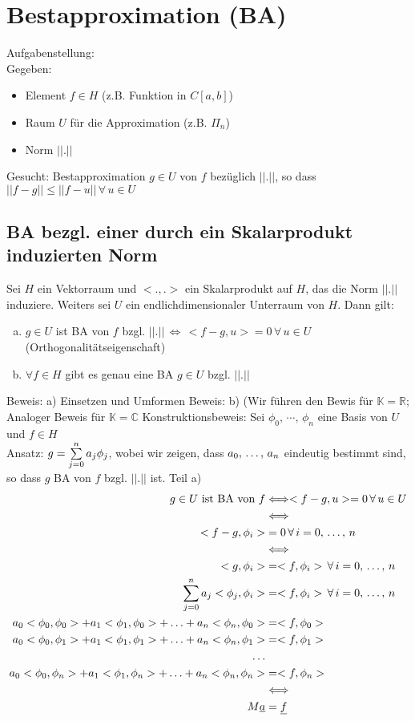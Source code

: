 \section{Bestapproximation (BA)}
Aufgabenstellung:\\
Gegeben:
\begin{itemize}
  \item Element $f \in H$ (z.B. Funktion in $C[a,b]$)
  \item Raum $U$ für die Approximation (z.B. $\Pi_n$)
  \item Norm $||.||$
\end{itemize}
Gesucht:
Bestapproximation $g \in U$ von $f$ bezüglich $||.||$, so dass 
$||f - g|| \leq ||f - u||\,\forall\,u \in U$

\subsection{BA bezgl. einer durch ein Skalarprodukt induzierten Norm}
 Sei $H$ ein Vektorraum und $<.,.>$ ein Skalarprodukt auf $H$, das die
Norm $||.||$ induziere. Weiters sei $U$ ein endlichdimensionaler Unterraum von $H$.
Dann gilt:
\begin{enumerate}[(a)]
  \item $g \in U$ ist BA von $f$ bzgl. 
    $||.||\,\Longleftrightarrow\,<f - g, u> = 0\,\forall\,u \in U$
    (Orthogonalitätseigenschaft)
  \item $\forall f \in H$ gibt es genau eine BA $g \in U$ bzgl. $||.||$
\end{enumerate}
Beweis: a) Einsetzen und Umformen
Beweis: b) (Wir führen den Bewis für $\mathbb{K} = \mathbb{R}$;
Analoger Beweis für $\mathbb{K} = \mathbb{C}$
Konstruktionsbeweis: Sei ${\phi_0,\,\cdots,\,\phi_n}$ eine Basis von $U$ und $f \in H$\\
Ansatz: $g = \sum\limits_{j=0}^{n}{a_j \phi_j}$, wobei wir zeigen, dass $a_0,\,\ldots,\,a_n$
eindeutig bestimmt sind, so dass $g$ BA von $f$ bzgl. $||.||$ ist.
Teil a)
\begin{align*}
  g \in U \text{ ist BA von } f &\Longleftrightarrow <f - g, u> = 0\, \forall\, u \in U\\
  &\Longleftrightarrow\\
  <f-g, \phi_i> &= 0\, \forall\, i=0,\,\ldots,\,n\\
  &\Longleftrightarrow\\
  <g, \phi_i> &= <f, \phi_i>\, \forall\, i=0,\,\ldots,\,n\\
  \sum\limits_{j=0}^{n}{a_j<\phi_j,\phi_i>} &= <f, \phi_i>\, \forall\, i=0,\,\ldots,\,n\\
  a_0<\phi_0,\phi_0> + a_1<\phi_1,\phi_0> + \ldots + a_n<\phi_n,\phi_0> &= <f,\phi_0>\\
  a_0<\phi_0,\phi_1> + a_1<\phi_1,\phi_1> + \ldots + a_n<\phi_n,\phi_1> &= <f,\phi_1>\\
  \ldots\\
  a_0<\phi_0,\phi_n> + a_1<\phi_1,\phi_n> + \ldots + a_n<\phi_n,\phi_n> &= <f,\phi_n>\\
  &\Longleftrightarrow\\
  M\underline{a} &= \underline{f}
\end{align*}
